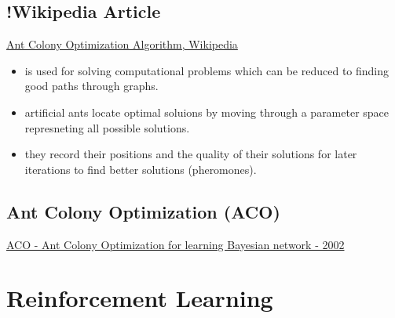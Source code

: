 \subsection{!Wikipedia Article}
\href{https://en.wikipedia.org/wiki/Ant_colony_optimization_algorithms}{Ant Colony Optimization Algorithm, Wikipedia}
\begin{itemize}[noitemsep,nolistsep]
	\item is used for solving computational problems which can be reduced to finding good paths through graphs.
	\item artificial ants locate optimal soluions by moving through a parameter space represneting all possible solutions.
	\item they record their positions and the quality of their solutions for later iterations to find better solutions (pheromones).
\end{itemize}

\subsection{Ant Colony Optimization (ACO)}
\href{https://www.sciencedirect.com/science/article/pii/S0888613X02000919}{ACO - Ant Colony Optimization for learning Bayesian network - 2002}

\section{Reinforcement Learning}

